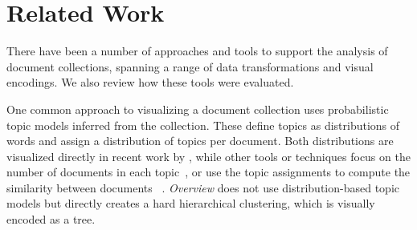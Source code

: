 

\section{Related Work}
\label{overview:rw}


There have been a number of approaches and tools to support the analysis of document collections, spanning a range of data transformations and visual encodings.  
We also review how these tools were evaluated.

One common approach to visualizing a document collection uses probabilistic topic models inferred from the collection. 
These define topics as distributions of words and assign a distribution of topics per document. 
Both distributions are visualized directly in recent work by \citet{Chaney2012}, while other tools or techniques focus on the number of documents in each topic~\cite{Cui2011,Dou2013,Liu2012}, or use the topic assignments to compute the similarity between documents ~\cite{Chen2009,Eisenstein2012}. 
{\it Overview} does not use distribution-based topic models but directly creates a hard hierarchical clustering, which is visually encoded as a tree.

